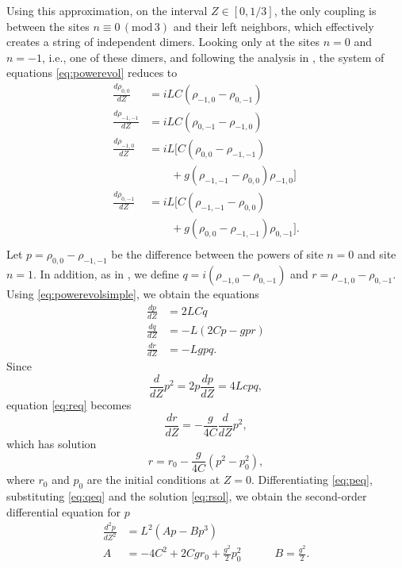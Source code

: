 \documentclass[reprint, amsmath,amssymb,aps,pre]{revtex4-2}
\begin{document}
Using this approximation, on the interval $Z \in [0, 1/3]$, the only coupling is between the sites $n \equiv0\,(\text{mod}\,3)$ and their left neighbors, which effectively creates a string of independent dimers. Looking only at the sites $n=0$ and $n=-1$, i.e., one of these dimers, and following the analysis in \cite{Kenkre1986}, the system of equations \cref{eq:powerevol} reduces to 
\begin{equation}\label{eq:powerevolsimple}
\begin{aligned}
\frac{d\rho_{0,0}}{dZ} &= iLC \left( \rho_{-1,0} - \rho_{0,-1} \right) \\
\frac{d\rho_{-1,-1}}{dZ}  &= iLC \left( \rho_{0,-1} - \rho_{-1,0} \right) \\
\frac{d\rho_{-1,0} }{dZ} &= iL \big[ C(\rho_{0,0} - \rho_{-1,-1}) \\
&\qquad + g ( \rho_{-1,-1} - \rho_{0,0}) \rho_{-1,0} \big] \\
\frac{d\rho_{0,-1}}{dZ}  &= iL \big[ C(\rho_{-1,-1} - \rho_{0,0}) \\
&\qquad + g ( \rho_{0,0} - \rho_{-1,-1} ) \rho_{0,-1} \big].\\
\end{aligned}
\end{equation}
Let $p = \rho_{0,0} - \rho_{-1,-1}$ be the difference between the powers of site $n=0$ and site $n=1$. In addition, as in \cite{Kenkre1989}, we define $q = i(\rho_{-1,0} - \rho_{0,-1})$ and $r = \rho_{-1,0} - \rho_{0,-1}$. Using \cref{eq:powerevolsimple}, we obtain the equations
\begin{align}
\frac{dp}{dZ} &= 2LCq \label{eq:peq}\\
\frac{dq}{dZ} &= -L(2Cp - gpr) \label{eq:qeq}\\
\frac{dr}{dZ} &= -Lgpq. \label{eq:req}
\end{align}
Since
\[
\frac{d}{dZ}p^2 = 2p \frac{dp}{dZ} = 4Lcpq,
\]
equation \cref{eq:req} becomes
\[
\frac{dr}{dZ} = -\frac{g}{4C}\frac{d}{dZ}p^2,
\]
which has solution
\begin{equation}\label{eq:rsol}
r = r_0 - \frac{g}{4C}\left( p^2 - p_0^2 \right),
\end{equation}
where $r_0$ and $p_0$ are the initial conditions at $Z=0$. Differentiating \cref{eq:peq}, substituting \cref{eq:qeq} and the solution \cref{eq:rsol}, we obtain the second-order differential equation for $p$
\begin{equation}\label{eq:pode}
\begin{aligned}
\frac{d^2p}{dZ^2} &= L^2 \left( A p - B p^3 \right) \\
A &= -4C^2 + 2Cgr_0 + \frac{g^2}{2}p_0^2
\qquad\quad B = \frac{g^2}{2}.
\end{aligned}
\end{equation}
\end{document}

